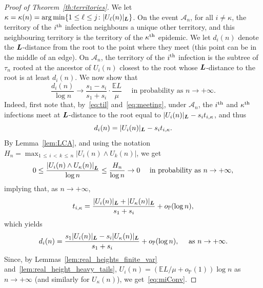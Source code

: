 \documentclass[10pt]{amsart}
\theoremstyle{definition}\newtheorem{defi}[theo]{Definition}\newtheorem{rema}[theo]{Remark}\newtheorem{exam}[theo]{Example}\newtheorem{exem}[theo]{Example}\newtheorem{nota}[theo]{Notation}
\DeclareMathOperator*{\argmin}{arg\,min}
\newcommand{\bs}{\ensuremath{\boldsymbol}}
\newcommand{\op}{{o_{\bbP}}}
\newcommand{\bbP}{\mathbb{P}}
\newcommand{\bbE}{\mathbb{E}}
\newcommand{\clA}{\mathcal{A}}
\begin{document}
\begin{proof}[Proof of Theorem~\ref{th:territories}]
We let $\kappa = \kappa(n) = \argmin \{1\leq \ell\leq j\colon |U_\ell(n)|_{\bs L}\}$. On the event $\clA_n$, for all $i\neq \kappa$, the territory of the $i^{\rm th}$ infection neighbours a unique other territory, and this neighbouring territory is the territory of the $\kappa^{\rm th}$ epidemic. We let $d_i(n)$ denote the $\bs L$-distance from the root to the point where they meet (this point can be in the middle of an edge). On $\clA_n$, the territory of the $i^{\rm th}$ infection is the subtree of $\tau_n$ rooted at the ancestor of $U_i(n)$ closest to the root whose $\bs L$-distance to the root is at least $d_i(n)$. We now show that
\begin{equation}\label{eq:miConv}
\frac{d_i(n)}{\log n} \to
\frac{s_1-s_i}{s_1+s_i}\cdot\frac{\bbE L}{\mu}\quad\text{ in probability as }n\to+\infty.
\end{equation}
Indeed, first note that, by~\eqref{eq:til} and~\eqref{eq:meeting}, under $\clA_n$, the $i^{\rm th}$ and $\kappa^{\rm th}$ infections meet at $\bs L$-distance to the root equal to $|U_i(n)|_{\bs L} - s_i t_{i, \kappa}$, and thus
\[
d_i(n) = |U_i(n)|_{\bs L}-s_i t_{i,\kappa}.
\]
By Lemma~\ref{lem:LCA}, and using the notation $H_n=\max_{1\,\le\,i\,<\,k\,\le \,n} |U_i(n)\wedge U_k(n)|$, we get
\begin{equation}\label{eq:top_height_negl}
0\leq \frac{\left|U_i(n)\wedge U_\kappa(n)\right|_{\bs L}}{\log n}
\leq \frac{H_n}{\log n} \to 0 \quad\text{ in probability as }n\to+\infty,
\end{equation}
implying that, as $n\to+\infty$,
\begin{equation}\label{eq:approx_tcross}
t_{i, \kappa} = \frac{|U_i(n)|_{\bs L}+|U_\kappa(n)|_{\bs L}}{s_1+s_i} + \op(\log n),
\end{equation}
which yields
\[
d_i(n) = \frac{s_1|U_i(n)|_{\bs L}-s_i |U_\kappa(n)|_{\bs L}}{s_1+s_i} + \op(\log n),\quad\text{ as }n\to+\infty.
\]
Since, by Lemmas~\ref{lem:real_heights_finite_var} and~\ref{lem:real_height_heavy_tails}, $U_i(n)=(\bbE L/\mu+\op(1)) \log n$ as $n\to+\infty$ (and similarly for $U_\kappa(n)$), we get~\eqref{eq:miConv}.


\end{proof}
\end{document}
